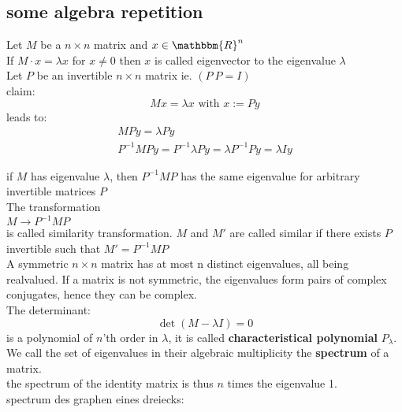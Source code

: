 \documentclass[a4paper]{article}
\theoremstyle{definition}
\theoremstyle{remark}
\begin{document}
\subsection{some algebra repetition}
\label{sub:some_algebra_repetition}


	Let $M$ be a  $n\times n$ matrix and  $x\in \mathbbm{R}^n$ \\
	If  $M\cdot x=\lambda x$ for $x\neq 0$ then $x$ is called eigenvector to the eigenvalue $\lambda $\\
	Let $P$ be an invertible  $n\times n $ matrix ie. $(P^{~}P=I)$\\
claim:
\begin{equation*}
		Mx=\lambda x \textrm{ with  }  x:= Py 
\end{equation*}
leads to:  \\
\begin{gather*}
	MPy=\lambda Py\\
	P^{-1}MPy=P^{-1}\lambda Py=\lambda P^{-1}Py=\lambda Iy
\end{gather*}

if $M$ has eigenvalue  $\lambda$, then  $P^{-1}MP$  has the same eigenvalue for arbitrary invertible matrices $P$\\
The transformation \\
$M\rightarrow P^{-1}MP$\\
is called similarity transformation. $M$ and $M'$ are called similar if there exists $P$ invertible such that $M'=P^{-1}MP$\\

A symmetric $n\times n$ matrix has at most n distinct eigenvalues, all being realvalued. If a matrix is not symmetric, the eigenvalues form pairs of complex conjugates, hence they can be complex.\\
The determinant:\\ 
\begin{equation}
  \det(M-\lambda I)=0
\end{equation}
is a polynomial of $n$'th order in $\lambda $, it is called \textbf{characteristical polynomial} $P_\lambda $.\\
We call the set of eigenvalues in their algebraic multiplicity the \textbf{spectrum} of a matrix.\\
the spectrum of the identity matrix is thus $n $ times the eigenvalue 1.\\
spectrum des graphen eines dreiecks:
\end{document}
